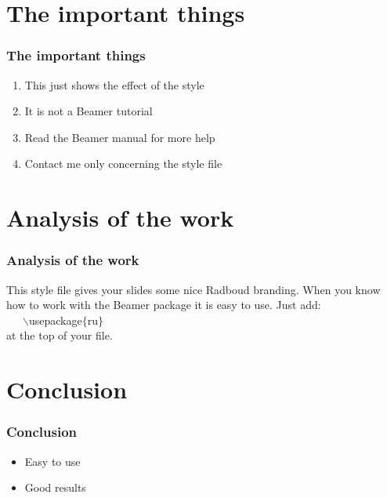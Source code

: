 \documentclass{beamer}
\begin{document}
\section{The important things}

\begin{frame}
	\frametitle{The important things}

	\begin{enumerate}
	        \item This just shows the effect of the style
		\item It is not a Beamer tutorial
		\item Read the Beamer manual for more help
		\item Contact me only concerning the style file
	\end{enumerate}
\end{frame}

\section{Analysis of the work}

\begin{frame}
	  \frametitle{Analysis of the work}

	    This style file gives your slides some nice Radboud branding.
	    When you know how to work with the Beamer package it is easy to use.
	    Just add:\\ ~~~$\backslash$usepackage$\{$ru$\}$ \\ at the top of your file.
\end{frame}

\section{Conclusion}

\begin{frame}
	  \frametitle{Conclusion}

	  \begin{itemize}
	  	\item Easy to use
		\item Good results
	  \end{itemize}
\end{frame}
\end{document}
